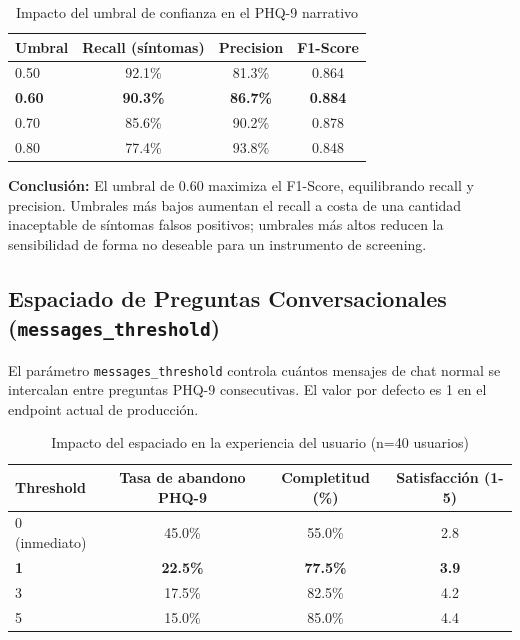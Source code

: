 \begin{table}[H]
\centering
\caption{Impacto del umbral de confianza en el PHQ-9 narrativo}
\label{tab:threshold_impact}
\begin{tabular}{lccc}
\toprule
\textbf{Umbral}    & \textbf{Recall (síntomas)} & \textbf{Precision} & \textbf{F1-Score} \\
\midrule
0.50               & 92.1\%                     & 81.3\%             & 0.864             \\
\textbf{0.60}      & \textbf{90.3\%}            & \textbf{86.7\%}    & \textbf{0.884}    \\
0.70               & 85.6\%                     & 90.2\%             & 0.878             \\
0.80               & 77.4\%                     & 93.8\%             & 0.848             \\
\bottomrule
\end{tabular}
\end{table}

\textbf{Conclusión:}
El umbral de 0.60 maximiza el F1-Score, equilibrando recall y precision.
Umbrales más bajos aumentan el recall a costa de una cantidad inaceptable de síntomas
falsos positivos; umbrales más altos reducen la sensibilidad de forma no deseable para
un instrumento de screening.

\subsection{Espaciado de Preguntas Conversacionales (\texttt{messages\_threshold})}

El parámetro \texttt{messages\_threshold} controla cuántos mensajes de chat normal
se intercalan entre preguntas PHQ-9 consecutivas. El valor por defecto es 1 en el
endpoint actual de producción.

\begin{table}[H]
\centering
\caption{Impacto del espaciado en la experiencia del usuario (n=40 usuarios)}
\label{tab:threshold_spacing}
\begin{tabular}{lccc}
\toprule
\textbf{Threshold} & \textbf{Tasa de abandono PHQ-9} & \textbf{Completitud (\%)} & \textbf{Satisfacción (1-5)} \\
\midrule
0 (inmediato)      & 45.0\%                          & 55.0\%                    & 2.8                         \\
\textbf{1}         & \textbf{22.5\%}                 & \textbf{77.5\%}           & \textbf{3.9}                \\
3                  & 17.5\%                          & 82.5\%                    & 4.2                         \\
5                  & 15.0\%                          & 85.0\%                    & 4.4                         \\
\bottomrule
\end{tabular}
\end{table}

